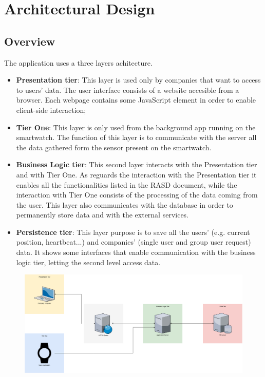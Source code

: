 \documentclass{article}
\begin{document}
\section{Architectural Design}
\subsection{Overview}
The application uses a three layers achitecture.
\begin{itemize}
\item \textbf{Presentation tier}: This layer is used only by companies that want to access to users' data. The user interface consists of a website accesible from a browser. Each webpage contains some JavaScript element in order to enable client-side interaction;
\item \textbf{Tier One}: This layer is only used from the background app running on the smartwatch. The function of this layer is to communicate with the server all the data gathered form the sensor present on the smartwatch. 
\item \textbf{Business Logic tier}: This second layer interacts with the Presentation tier and with Tier One. As reguards the interaction with the Presentation tier it enables all the functionalities listed in the RASD document, while the interaction with Tier One consists of the processing of the data coming from the user. This layer also communicates with the database in order to permanently store data and with the external services.
\item \textbf{Persistence tier}: This layer purpose is to save all the users' (e.g. current position, heartbeat...) and companies' (single user and group user request) data. It shows some interfaces that enable communication with the business logic tier, letting the second level access data.
\end{itemize}
\begin{figure}[h!]
\centering
    \textbf{}\par\medskip
	\includegraphics[width= \linewidth]{tier.png}
\end{figure}
\end{document}
